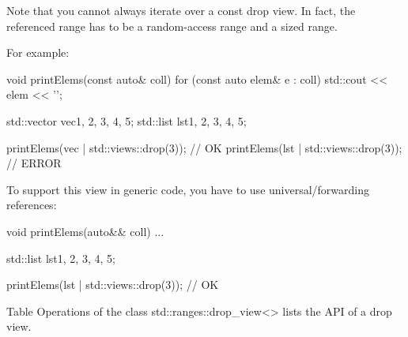Note that you cannot always iterate over a const drop view. In fact, the referenced range has to be a random-access range and a sized range.

For example:

\begin{cpp}
void printElems(const auto& coll) {
	for (const auto elem& e : coll) {
		std::cout << elem << '\n';
	}
}

std::vector vec{1, 2, 3, 4, 5};
std::list lst{1, 2, 3, 4, 5};

printElems(vec | std::views::drop(3)); // OK
printElems(lst | std::views::drop(3)); // ERROR
\end{cpp}

To support this view in generic code, you have to use universal/forwarding references:

\begin{cpp}
void printElems(auto&& coll) {
	...
}

std::list lst{1, 2, 3, 4, 5};

printElems(lst | std::views::drop(3)); // OK
\end{cpp}


Table Operations of the class std::ranges::drop\_view<> lists the API of a drop view.

